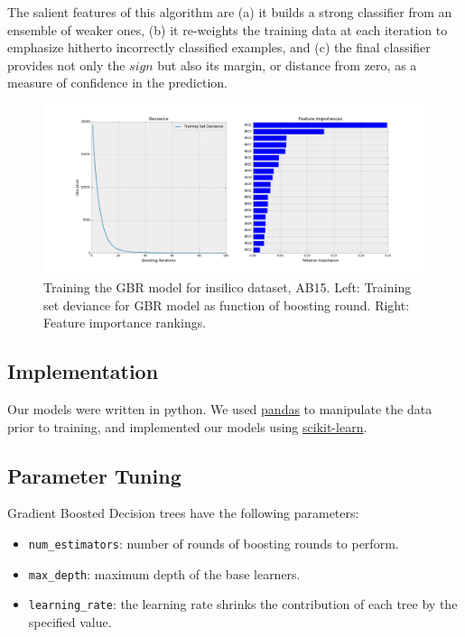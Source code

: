 \documentclass[letterpaper, 11pt]{article}
\begin{document}
The salient features of this algorithm are (a) it builds a strong classifier from an ensemble of weaker ones, (b) it re-weights the training data at each iteration to emphasize hitherto incorrectly classified examples, and (c) the final classifier provides not only the $sign$ but also its margin, or distance from zero, as a measure of confidence in the prediction.

\begin{figure}
  \centering
  \includegraphics[width=1.0\textwidth]{deviance_feature_importance.png}
  \caption{Training the GBR model for insilico dataset, AB15. Left: Training set deviance for GBR model as function of boosting round. Right: Feature importance rankings.}
\end{figure}
\subsection{Implementation}

Our models were written in python. We used \href{http://pandas.pydata.org/}{pandas} to manipulate the data prior to training, and implemented our models using \href{http://scikit-learn.org/stable/}{scikit-learn}.

\subsection{Parameter Tuning}

Gradient Boosted Decision trees have the following parameters:
\begin{itemize}
  \item \texttt{num\_estimators}: number of rounds of boosting rounds to perform.
  \item \texttt{max\_depth}: maximum depth of the base learners.
  \item \texttt{learning\_rate}: the learning rate shrinks the contribution of each tree by the specified value.
\end{itemize}
\end{document}
